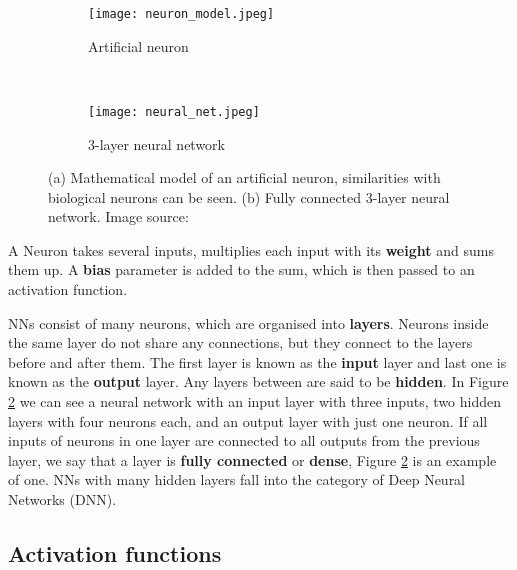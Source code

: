 \begin{figure}[ht] 
    \begin{subfigure}[b]{0.5\textwidth}
        \centering
        \texttt{[image: neuron\_model.jpeg]} 
        \caption{Artificial neuron}
        \label{neuron_model}
    \end{subfigure}
    \unskip\ \vrule\ 
    \begin{subfigure}[b]{0.5\textwidth}
        \centering
        \texttt{[image: neural\_net.jpeg]} 
        \caption{ 3-layer neural network}
        \label{neural_net}
    \end{subfigure}
    
    \caption[Mathematical model of artificial neuron and fully connected 3-layer neural network.]{(a) Mathematical model of an artificial neuron, similarities with biological neurons can be seen. (b) Fully connected 3-layer neural network. Image source: \cite{cs231n}}
    \label{neural}
\end{figure}

A Neuron takes several inputs, multiplies each input with its \textbf{weight} and sums them up.
A \textbf{bias} parameter is added to the sum, which is then passed to an activation function.

NNs consist of many neurons, which are organised into \textbf{layers}.
Neurons inside the same layer do not share any connections, but they connect to the layers before and after them.
The first layer is known as the \textbf{input} layer and last one is known as the \textbf{output} layer. 
Any layers between are said to be \textbf{hidden}. 
In Figure \ref{neural_net} we can see a neural network with an input layer with three inputs, two hidden layers with four neurons each, and an output layer with just one neuron.
If all inputs of neurons in one layer are connected to all outputs from the previous layer, we say that a layer is \textbf{fully connected} or \textbf{dense}, Figure \ref{neural_net} is an example of one.
NNs with many hidden layers fall into the category of Deep Neural Networks (DNN).


\subsection{ Activation functions}

